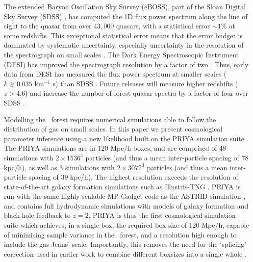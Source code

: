 The extended Baryon Oscillation Sky Survey (eBOSS), part of the Sloan Digital Sky Survey (SDSS) \cite{2019JCAP...07..017C}, has computed the 1D flux power spectrum along the line of sight to the quasar from over $43,000$ quasars, with a statistical error $\sim 1\%$ at some redshifts. This exceptional statistical error means that the error budget is dominated by systematic uncertainty, especially uncertainty in the resolution of the spectrograph on small scales \cite{2019JCAP...07..017C}. The Dark Energy Spectroscopic Instrument (DESI) has improved the spectrograph resolution by a factor of two \cite{2022AJ....164..207A}.
Thus, early data from DESI has measured the flux power spectrum at smaller scales ($k \gtrsim 0.035$ km$^{-1}$ s) than SDSS \cite{2023arXiv230606316G, 2023arXiv230606311R}. Future releases will measure higher redshifts ($z>4.6$) and increase the number of \lya forest quasar spectra by a factor of four over SDSS \cite{2016arXiv161100036D}.

Modelling the \lya~forest requires numerical simulations able to follow the distribution of gas on small scales. In this paper we present cosmological parameter inference using a new likelihood built on the PRIYA simulation suite \cite{2023simsuite}. The PRIYA simulations are in $120$ Mpc/h boxes, and are comprised of $48$ simulations with $2\times 1536^3$ particles (and thus a mean inter-particle spacing of $78$ kpc/h), as well as $3$ simulations with $2\times 3072^3$ particles (and thus a mean inter-particle spacing of $39$ kpc/h). The highest resolution exceeds the resolution of state-of-the-art galaxy formation simulations such as Illustris-TNG \cite{2018MNRAS.475..676S}. PRIYA is run with the same highly scalable MP-Gadget code as the ASTRID simulation \cite{2022MNRAS.512.3703B,2022MNRAS.513..670N}, and contains full hydrodynamic simulations with models of galaxy formation and black hole feedback to $z=2$. PRIYA is thus the first cosmological simulation suite which achieves, in a single box, the required box size of $120$ Mpc/h, capable of minimising sample variance in the \lya~forest\cite{2014JCAP...07..005B}, and a resolution high enough to include the gas Jeans' scale. Importantly, this removes the need for the `splicing' correction used in earlier work to combine different boxsizes into a single whole \cite{2014JCAP...07..005B,2020JCAP...04..038P}.

